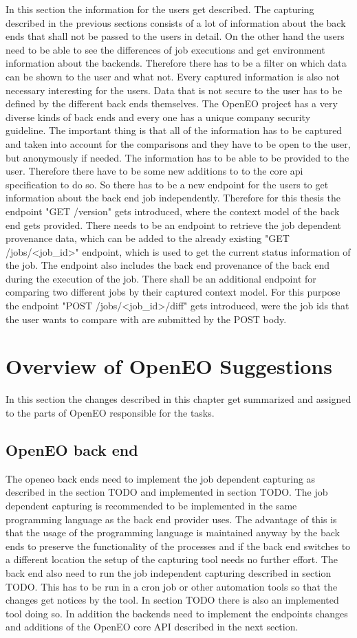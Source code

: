 \documentclass[draft,final]{vutinfth} %
\begin{document}
In this section the information for the users get described. The capturing described in the previous sections consists of a lot of  information about the back ends that shall not be passed to the users in detail. On the other hand the users need to be able to see the differences of job executions and get environment information about the backends. Therefore there has to be a filter on which data can be shown to the user and what not. Every captured information is also not necessary interesting for the users. Data that is not secure to the user has to be defined by the different back ends themselves. The OpenEO project has a very diverse kinds of back ends and every one has a unique company security guideline. The important thing is that all of the information has to be captured and taken into account for the comparisons and they have to be open to the user, but anonymously if needed.
The information has to be able to be provided to the user. Therefore there have to be some new additions to to the core api specification to do so. So there has to be a new endpoint for  the users to get information about the back end job independently. Therefore for this thesis the endpoint "GET /version" gets introduced, where the context model of the back end gets provided. 
There needs to be an endpoint to retrieve the job dependent provenance data, which can be added to the already existing "GET /jobs/<job\_id>" endpoint, which is used to get the current status information of the job. The endpoint also includes the back end provenance of the back end during the execution of the job. 
There shall be an additional endpoint for comparing two different jobs by their captured context model. For this purpose the endpoint "POST /jobs/<job\_id>/diff" gets introduced, were the job ids that the user wants to compare with are submitted by the POST body. 

\section{Overview of OpenEO Suggestions}
In this section the changes described in this chapter get summarized and assigned to the parts of OpenEO responsible for the tasks.

\subsection{OpenEO back end}
The openeo back ends need to implement the job dependent capturing as described in the section TODO and implemented in section TODO. The job dependent capturing is recommended to be implemented in the same programming language as the back end provider uses. The advantage of this is that the usage of the programming language is maintained anyway by the back ends to preserve the functionality of the processes and if the back end switches to a different location the setup of the capturing tool needs no further effort. 
The back end also need to run the job independent capturing described in section TODO. This has to be run in a cron job or other automation tools so that the changes get notices by the tool. In section TODO there is also an implemented tool doing so. 
In addition the backends need to implement the endpoints changes and additions of the OpenEO core API described in the next section.   
\end{document}
